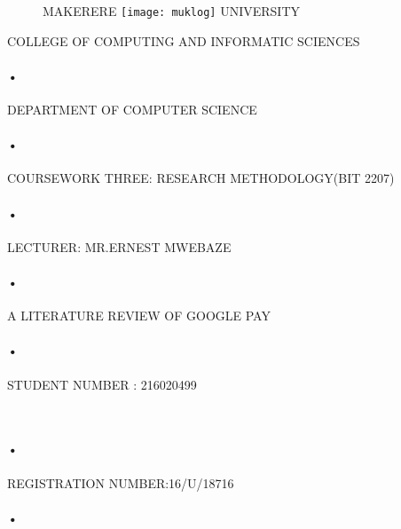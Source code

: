 \documentclass[10pt,a4paper]{article}
\begin{document}
\begin{titlepage}
 \begin{figure}[h]
  \centerline{\small MAKERERE 
  \texttt{[image: muklog]} UNIVERSITY}
\end{figure}
\centerline{COLLEGE OF COMPUTING AND INFORMATIC SCIENCES}
\paragraph{•}
\centerline{DEPARTMENT OF COMPUTER SCIENCE\\}
\paragraph{•}

\centerline{COURSEWORK THREE: RESEARCH METHODOLOGY(BIT 2207)\\}
\paragraph{•}
\centerline{LECTURER: MR.ERNEST MWEBAZE}
\paragraph{•}
         \centerline{A LITERATURE REVIEW OF GOOGLE PAY}
          \author{BAMWIREKU PRISCA}
 \paragraph{•}
\centerline{STUDENT NUMBER : 216020499}\
\paragraph{•}
\centerline{REGISTRATION NUMBER:16/U/18716}
\paragraph{•}
\end{titlepage}

\tableofcontents
\newpage
{}
\end{document}
